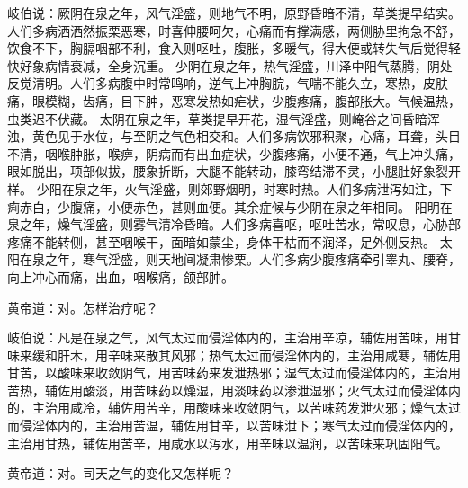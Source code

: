\documentclass[a4paper,12pt,UTF8,twoside]{ctexbook}
\begin{document}
岐伯说：厥阴在泉之年，风气淫盛，则地气不明，原野昏暗不清，草类提早结实。人们多病洒洒然振栗恶寒，时喜伸腰呵欠，心痛而有撑满感，两侧胁里拘急不舒，饮食不下，胸膈咽部不利，食入则呕吐，腹胀，多暖气，得大便或转失气后觉得轻快好象病情衰减，全身沉重。
少阴在泉之年，热气淫盛，川泽中阳气蒸腾，阴处反觉清明。人们多病腹中时常鸣响，逆气上冲胸脘，气喘不能久立，寒热，皮肤痛，眼模糊，齿痛，目下肿，恶寒发热如疟状，少腹疼痛，腹部胀大。气候温热，虫类迟不伏藏。
太阴在泉之年，草类提早开花，湿气淫盛，则崦谷之间昏暗浑浊，黄色见于水位，与至阴之气色相交和。人们多病饮邪积聚，心痛，耳聋，头目不清，咽喉肿胀，喉痹，阴病而有出血症状，少腹疼痛，小便不通，气上冲头痛，眼如脱出，项部似拔，腰象折断，大腿不能转动，膝弯结滞不灵，小腿肚好象裂开样。
少阳在泉之年，火气淫盛，则郊野烟明，时寒时热。人们多病泄泻如注，下痢赤白，少腹痛，小便赤色，甚则血便。其余症候与少阴在泉之年相同。
阳明在泉之年，燥气淫盛，则雾气清冷昏暗。人们多病喜呕，呕吐苦水，常叹息，心胁部疼痛不能转侧，甚至咽喉干，面暗如蒙尘，身体干枯而不润泽，足外侧反热。
太阳在泉之年，寒气淫盛，则天地间凝肃惨栗。人们多病少腹疼痛牵引睾丸、腰脊，向上冲心而痛，出血，咽喉痛，颌部肿。

黄帝道：对。怎样治疗呢？

岐伯说：凡是在泉之气，风气太过而侵淫体内的，主治用辛凉，辅佐用苦味，用甘味来缓和肝木，用辛味来散其风邪；热气太过而侵淫体内的，主治用咸寒，辅佐用甘苦，以酸味来收敛阴气，用苦味药来发泄热邪；湿气太过而侵淫体内的，主治用苦热，辅佐用酸淡，用苦味药以燥湿，用淡味药以渗泄湿邪；火气太过而侵淫体内的，主治用咸冷，辅佐用苦辛，用酸味来收敛阴气，以苦味药发泄火邪；燥气太过而侵淫体内的，主治用苦温，辅佐用甘辛，以苦味泄下；寒气太过而侵淫体内的，主治用甘热，辅佐用苦辛，用咸水以泻水，用辛味以温润，以苦味来巩固阳气。

黄帝道：对。司天之气的变化又怎样呢？
\end{document}
